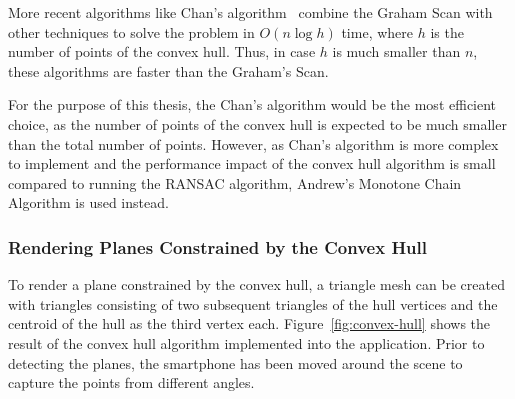 More recent algorithms like Chan's algorithm~\cite{chan_optimal_1996} combine the Graham Scan with other techniques to solve the problem in $O(n \log h)$ time,
where $h$ is the number of points of the convex hull.
Thus, in case $h$ is much smaller than $n$, these algorithms are faster than the Graham's Scan.

For the purpose of this thesis, the Chan's algorithm would be the most efficient choice,
as the number of points of the convex hull is expected to be much smaller than the total number of points.
However, as Chan's algorithm is more complex to implement and the performance impact of the convex hull algorithm
is small compared to running the RANSAC algorithm, Andrew's Monotone Chain Algorithm is used instead.

\subsubsection{Rendering Planes Constrained by the Convex Hull}
To render a plane constrained by the convex hull,
a triangle mesh can be created with triangles consisting of two subsequent triangles of the hull vertices and the centroid of the hull as the third vertex each.
Figure~\ref{fig:convex-hull} shows the result of the convex hull algorithm implemented into the application.
Prior to detecting the planes, the smartphone has been moved around the scene to capture the points from different angles.

